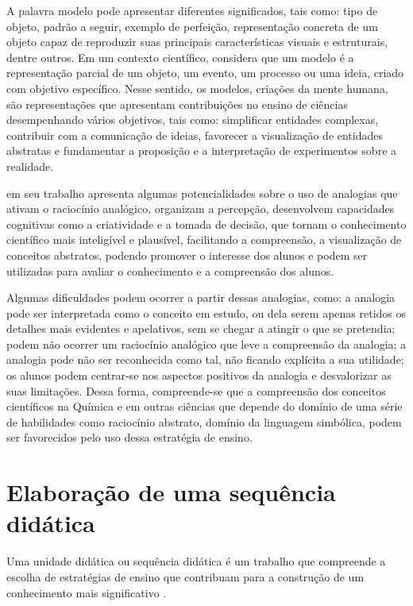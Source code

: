 \begin{refsection}
    A palavra modelo pode apresentar diferentes significados, tais como: tipo de objeto, padrão a seguir, exemplo de perfeição, representação concreta de um objeto capaz de reproduzir suas principais características visuais e estruturais, dentre outros. Em um contexto científico, \textcite{GILBERT2004Models} considera que um modelo é a representação parcial de um objeto, um evento, um processo ou uma ideia, criado com objetivo específico. Nesse sentido, os modelos, criações da mente humana, são representações que apresentam contribuições no ensino de ciências desempenhando vários objetivos, tais como: simplificar entidades complexas, contribuir com a comunicação de ideias, favorecer a visualização de entidades abstratas e fundamentar a proposição e a interpretação de experimentos sobre a realidade. 

    \textcite{DUARTE2005Analogias} em seu trabalho apresenta algumas potencialidades sobre o uso de analogias que ativam o raciocínio analógico, organizam a percepção, desenvolvem capacidades cognitivas como a criatividade e a tomada de decisão, que tornam o conhecimento científico mais inteligível e plausível, facilitando a compreensão, a visualização de conceitos abstratos, podendo promover o interesse dos alunos e podem ser utilizadas para avaliar o conhecimento e a compreensão dos alunos.  

    Algumas dificuldades podem ocorrer a partir dessas analogias, como: a analogia pode ser interpretada como o conceito em estudo, ou dela serem apenas retidos os detalhes mais evidentes e apelativos, sem se chegar a atingir o que se pretendia; podem não ocorrer um raciocínio analógico que leve a compreensão da analogia; a analogia pode não ser reconhecida como tal, não ficando explícita a sua utilidade; os alunos podem centrar-se nos aspectos positivos da analogia e desvalorizar as suas limitações. Dessa forma, compreende-se que a compreensão dos conceitos científicos na Química e em outras ciências que depende do domínio de uma série de habilidades como raciocínio abstrato, domínio da linguagem simbólica, podem ser favorecidos pelo uso dessa estratégia de ensino. 

    \section{Elaboração de uma sequência didática}

    Uma unidade didática ou sequência didática é um trabalho que compreende a escolha de estratégias de ensino que contribuam para a construção de um conhecimento mais significativo \cite{CAAMAÑO2011Enseñar}.


\end{refsection}
